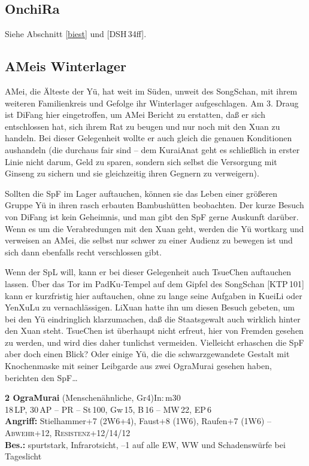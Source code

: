 \documentclass[
a4paper,
twoside,
DIV=calc,
BCOR=4mm,
fontsize=9pt,
twocolumn=on,
titlepage=on,
parskip=half
]{scrartcl}
\begin{document}
\subsection{OnchiRa}

Siehe Abschnitt \ref{biest} und [DSH\,34ff].

\subsection{AMeis Winterlager}
\label{winterlager}

AMei, die Älteste der Yü, hat weit im Süden, unweit des SongSchan, mit
ihrem weiteren Familienkreis und Gefolge ihr Winterlager
aufgeschlagen. Am 3. Draug ist DiFang hier eingetroffen, um AMei
Bericht zu erstatten, daß er sich entschlossen hat, sich ihrem Rat zu
beugen und nur noch mit den Xuan zu handeln. Bei dieser Gelegenheit
wollte er auch gleich die genauen Konditionen aushandeln (die durchaus
fair sind -- dem KuraiAnat geht es schließlich in erster Linie nicht
darum, Geld zu sparen, sondern sich selbst die Versorgung mit Ginseng
zu sichern und sie gleichzeitig ihren Gegnern zu verweigern).

Sollten die SpF im Lager auftauchen, können sie das Leben einer
größeren Gruppe Yü in ihren rasch erbauten Bambushütten
beobachten. Der kurze Besuch von DiFang ist kein Geheimnis, und man
gibt den SpF gerne Auskunft darüber. Wenn es um die Verabredungen mit
den Xuan geht, werden die Yü wortkarg und verweisen an AMei, die
selbst nur schwer zu einer Audienz zu bewegen ist und sich dann
ebenfalls recht verschlossen gibt.

Wenn der SpL will, kann er bei dieser Gelegenheit auch TsueChen
auftauchen lassen. Über das Tor im PadKu-Tempel auf dem Gipfel des
SongSchan [KTP\,101] kann er kurzfristig hier auftauchen, ohne zu
lange seine Aufgaben in KueiLi oder YenXuLu zu vernachlässigen. LiXuan
hatte ihn um diesen Besuch gebeten, um bei den Yü eindringlich
klarzumachen, daß die Staatsgewalt auch wirklich hinter den Xuan
steht. TsueChen ist überhaupt nicht erfreut, hier von Fremden gesehen
zu werden, und wird dies daher tunlichst vermeiden. Vielleicht
erhaschen die SpF aber doch einen Blick? Oder einige Yü, die die
schwarzgewandete Gestalt mit Knochenmaske mit seiner Leibgarde aus
zwei OgraMurai gesehen haben, berichten den SpF\dots

\textbf{2 OgraMurai} (Menschenähnliche, Gr4)\hfill In:\,m30\\
18\,LP, 30\,AP -- PR -- St\,100, Gw\,15, B\,16 -- MW\,22, EP\,6\\
\textbf{Angriff:} Stielhammer+7 (2W6+4), Faust+8 (1W6), Raufen+7 (1W6)
-- \textsc{Abwehr}+12,
\textsc{Resistenz}+12/14/12\\
\textbf{Bes.:} spurtstark, Infrarotsicht, --1 auf alle EW, WW und
Schadenswürfe bei Tageslicht
\end{document}
